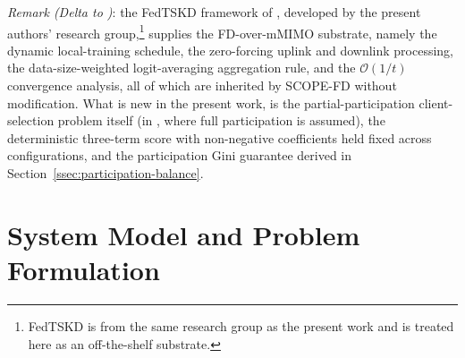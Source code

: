 \documentclass[journal]{IEEEtran}
\begin{document}
\textit{Remark (Delta to \cite{mu2024fedtskd})}: the FedTSKD framework of \cite{mu2024fedtskd}, developed by the present authors' research group,\footnote{FedTSKD \cite{mu2024fedtskd} is from the same research group as the present work and is treated here as an off-the-shelf substrate.} supplies the FD-over-mMIMO substrate, namely the dynamic local-training schedule, the zero-forcing uplink and downlink processing, the data-size-weighted logit-averaging aggregation rule, and the $\mathcal{O}(1/t)$ convergence analysis, all of which are inherited by SCOPE-FD without modification. What is new in the present work, is the partial-participation client-selection problem itself (in \cite{mu2024fedtskd}, where full participation is assumed), the deterministic three-term score with non-negative coefficients held fixed across configurations, and the participation Gini guarantee derived in Section~\ref{ssec:participation-balance}.

\section{System Model and Problem Formulation}
\label{sec:system-model}
\end{document}
